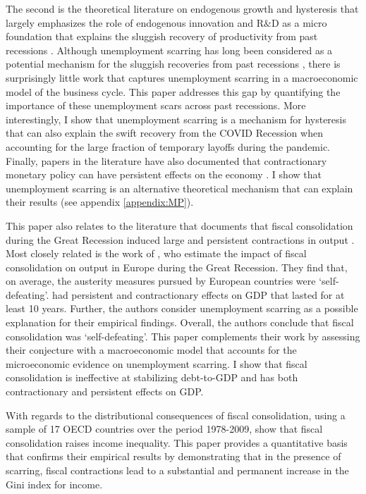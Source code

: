 The second is the theoretical literature on endogenous growth and hysteresis that largely emphasizes the role of endogenous innovation and R$\&$D as a micro foundation that explains the sluggish recovery of productivity from past recessions \citep{Comin2006,Queralto2018,Bianchi2019}.  Although unemployment scarring has long been considered as a potential mechanism for the sluggish recoveries from past recessions \citep{Cerra2023}, there is surprisingly little work that captures unemployment scarring in a macroeconomic model of the business cycle. This paper addresses this gap by quantifying the importance of these unemployment scars across past recessions. More interestingly, I show that unemployment scarring is a mechanism for hysteresis that can also explain the swift recovery from the COVID Recession when accounting for the large fraction of temporary layoffs during the pandemic. Finally, papers in the literature have also documented that contractionary monetary policy can have persistent effects on the economy \citep{Queralto2018, Jorda2023}. I show that unemployment scarring is an alternative theoretical mechanism that can explain their results (see appendix \ref{appendix:MP}). 

This paper also relates to the literature that documents that fiscal consolidation during the Great Recession induced large and persistent contractions in output \citep{Jorda2016,FATAS2018,House2020}. Most closely related is the work of \cite{FATAS2018}, who estimate the impact of fiscal consolidation on output in Europe during the Great Recession. They find that, on average, the austerity measures pursued by European countries were `self-defeating'. had persistent and contractionary effects on GDP that lasted for at least 10 years. Further, the authors consider unemployment scarring as a possible explanation for their empirical findings. Overall, the authors conclude that fiscal consolidation was `self-defeating'. This paper complements their work by assessing their conjecture with a macroeconomic model that accounts for the microeconomic evidence on unemployment scarring. I show that fiscal consolidation is ineffective at stabilizing debt-to-GDP and has both contractionary and persistent effects on GDP. 

With regards to the distributional consequences of fiscal consolidation, using a sample of 17 OECD countries over the period 1978-2009,  \cite{Ball2013} show that fiscal consolidation raises income inequality. This paper provides a quantitative basis that confirms their empirical results by demonstrating that in the presence of scarring, fiscal contractions lead to a substantial and permanent increase in the Gini index for income. 


